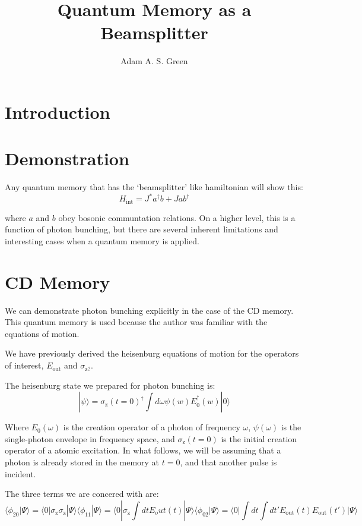 \documentclass[12pt]{article}
\author{Adam A. S. Green}
\title{Quantum Memory as a Beamsplitter}
\begin{document}


\maketitle
\section{Introduction}


\section{Demonstration}

Any quantum memory that has the `beamsplitter' like hamiltonian will show this:
\begin{equation}
H_{\textrm{int}}= J^* a^\dagger b + J a b^\dagger
\end{equation}

where $a$ and $b$ obey bosonic communtation relations. On a higher level, this is a function of photon bunching, but there are several inherent limitations and interesting cases when a quantum memory is applied.

\section{CD Memory}
We can demonstrate photon bunching explicitly in the case of the CD memory\cite{arxiv}. This quantum memory is used because the author was familiar with the equations of motion.

We have previously derived the heisenburg equations of motion for the operators of interest, $E_{\textrm{out}}$ and $\sigma_{\textrm{z?}}$.

The heisenburg state we prepared for photon bunching is:
\begin{equation}
| \psi \rangle = \sigma_\textrm{z}(t=0)^\dagger \int d\omega \psi(w) E_0^\dagger(w) | 0 \rangle
\end{equation}

Where $E_0(\omega)$ is the creation operator of a photon of frequency $\omega$, $\psi(\omega)$ is the single-photon envelope in frequency space, and $\sigma_\textrm{z}(t=0)$ is the initial creation operator of a atomic excitation. In what follows, we will be assuming that a photon is already stored in the memory at $t=0$, and that another pulse is incident.

The three terms we are concered with are:
\begin{equation}
\langle \phi_{20}| \Psi \rangle =\langle 0 | \sigma_\textrm{z} \sigma_\textrm{z} | \Psi \rangle
\langle \phi_{11} | \Psi \rangle =\langle 0 | \sigma_\textrm{z} \int dt E_out(t) | \Psi \rangle
\langle \phi_{02} | \Psi \rangle = \langle 0 | \int dt \int dt' E_\textrm{out}(t) E_\textrm{out}(t') | \Psi \rangle
\end{equation}
\end{document}
